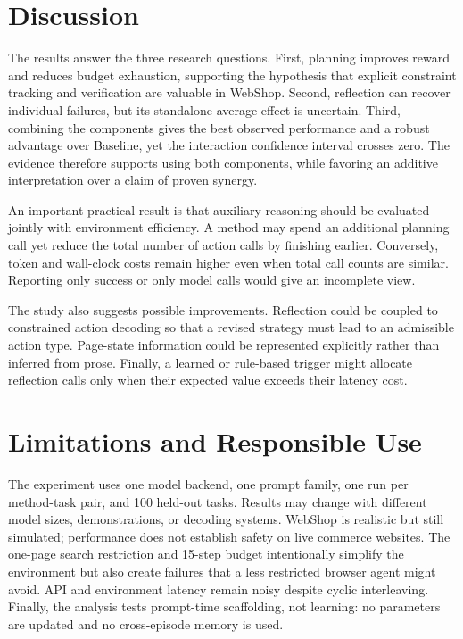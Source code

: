 \documentclass{article}
\begin{document}
\section{Discussion}

The results answer the three research questions. First, planning improves reward and reduces budget exhaustion, supporting the hypothesis that explicit constraint tracking and verification are valuable in WebShop. Second, reflection can recover individual failures, but its standalone average effect is uncertain. Third, combining the components gives the best observed performance and a robust advantage over Baseline, yet the interaction confidence interval crosses zero. The evidence therefore supports using both components, while favoring an additive interpretation over a claim of proven synergy.

An important practical result is that auxiliary reasoning should be evaluated jointly with environment efficiency. A method may spend an additional planning call yet reduce the total number of action calls by finishing earlier. Conversely, token and wall-clock costs remain higher even when total call counts are similar. Reporting only success or only model calls would give an incomplete view.

The study also suggests possible improvements. Reflection could be coupled to constrained action decoding so that a revised strategy must lead to an admissible action type. Page-state information could be represented explicitly rather than inferred from prose. Finally, a learned or rule-based trigger might allocate reflection calls only when their expected value exceeds their latency cost.

\section{Limitations and Responsible Use}

The experiment uses one model backend, one prompt family, one run per method-task pair, and 100 held-out tasks. Results may change with different model sizes, demonstrations, or decoding systems. WebShop is realistic but still simulated; performance does not establish safety on live commerce websites. The one-page search restriction and 15-step budget intentionally simplify the environment but also create failures that a less restricted browser agent might avoid. API and environment latency remain noisy despite cyclic interleaving. Finally, the analysis tests prompt-time scaffolding, not learning: no parameters are updated and no cross-episode memory is used.
\end{document}
